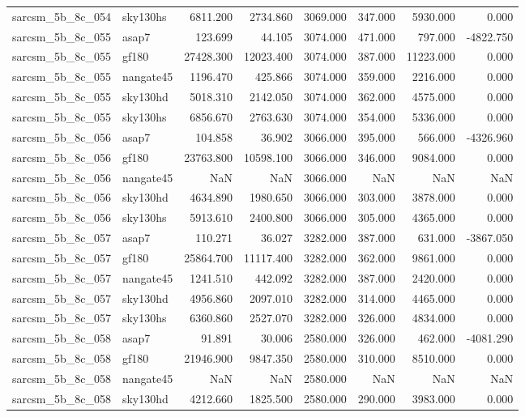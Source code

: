 \begin{tabular}{llrrrrrr}
sarcsm\_5b\_8c\_054 & sky130hs & 6811.200 & 2734.860 & 3069.000 & 347.000 & 5930.000 & 0.000 \\
sarcsm\_5b\_8c\_055 & asap7 & 123.699 & 44.105 & 3074.000 & 471.000 & 797.000 & -4822.750 \\
sarcsm\_5b\_8c\_055 & gf180 & 27428.300 & 12023.400 & 3074.000 & 387.000 & 11223.000 & 0.000 \\
sarcsm\_5b\_8c\_055 & nangate45 & 1196.470 & 425.866 & 3074.000 & 359.000 & 2216.000 & 0.000 \\
sarcsm\_5b\_8c\_055 & sky130hd & 5018.310 & 2142.050 & 3074.000 & 362.000 & 4575.000 & 0.000 \\
sarcsm\_5b\_8c\_055 & sky130hs & 6856.670 & 2763.630 & 3074.000 & 354.000 & 5336.000 & 0.000 \\
sarcsm\_5b\_8c\_056 & asap7 & 104.858 & 36.902 & 3066.000 & 395.000 & 566.000 & -4326.960 \\
sarcsm\_5b\_8c\_056 & gf180 & 23763.800 & 10598.100 & 3066.000 & 346.000 & 9084.000 & 0.000 \\
sarcsm\_5b\_8c\_056 & nangate45 & NaN & NaN & 3066.000 & NaN & NaN & NaN \\
sarcsm\_5b\_8c\_056 & sky130hd & 4634.890 & 1980.650 & 3066.000 & 303.000 & 3878.000 & 0.000 \\
sarcsm\_5b\_8c\_056 & sky130hs & 5913.610 & 2400.800 & 3066.000 & 305.000 & 4365.000 & 0.000 \\
sarcsm\_5b\_8c\_057 & asap7 & 110.271 & 36.027 & 3282.000 & 387.000 & 631.000 & -3867.050 \\
sarcsm\_5b\_8c\_057 & gf180 & 25864.700 & 11117.400 & 3282.000 & 362.000 & 9861.000 & 0.000 \\
sarcsm\_5b\_8c\_057 & nangate45 & 1241.510 & 442.092 & 3282.000 & 387.000 & 2420.000 & 0.000 \\
sarcsm\_5b\_8c\_057 & sky130hd & 4956.860 & 2097.010 & 3282.000 & 314.000 & 4465.000 & 0.000 \\
sarcsm\_5b\_8c\_057 & sky130hs & 6360.860 & 2527.070 & 3282.000 & 326.000 & 4834.000 & 0.000 \\
sarcsm\_5b\_8c\_058 & asap7 & 91.891 & 30.006 & 2580.000 & 326.000 & 462.000 & -4081.290 \\
sarcsm\_5b\_8c\_058 & gf180 & 21946.900 & 9847.350 & 2580.000 & 310.000 & 8510.000 & 0.000 \\
sarcsm\_5b\_8c\_058 & nangate45 & NaN & NaN & 2580.000 & NaN & NaN & NaN \\
sarcsm\_5b\_8c\_058 & sky130hd & 4212.660 & 1825.500 & 2580.000 & 290.000 & 3983.000 & 0.000 \\

\end{tabular}
